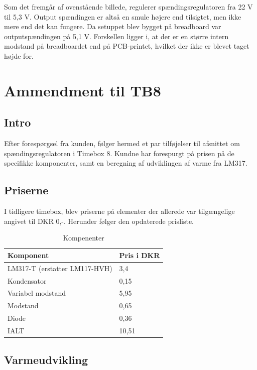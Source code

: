 Som det fremgår af ovenstående billede, regulerer spændingsregulatoren fra 22 V til 5,3 V. Output spændingen er altså en smule højere end tilsigtet, men ikke mere end det kan fungere. Da setuppet blev bygget på breadboard var outputspændingen på 5,1 V. Forskellen ligger i, at der er en større intern modstand på breadboardet end på PCB-printet, hvilket der ikke er blevet taget højde for. 
\clearpage
\section{Ammendment til TB8}
\label{sec:ammendment-til-tb8}

\subsection{Intro}
\label{sec:intro}

Efter forespørgsel fra kunden, følger hermed et par tilføjelser til afsnittet om spændingsregulatoren i Timebox 8. 
Kundne har forespurgt på prisen på de specifikke komponenter, samt en beregning af udviklingen af varme fra LM317. 

\subsection{Priserne}
\label{sec:priserne}

I tidligere timebox, blev priserne på elementer der allerede var tilgængelige angivet til DKR 0,-. Herunder følger den opdaterede prisliste.

\begin{table}[h]
  \centering
\begin{tabular}{ll}
\hline
Komponent & Pris i DKR \\
\hline
LM317-T (erstatter LM117-HVH) & 3,4 \\
\hline
Kondensator & 0,15 \\
\hline
Variabel modstand & 5,95 \\
\hline
Modstand & 0,65 \\
\hline
Diode & 0,36 \\
\hline
IALT & 10,51 \\
\hline
\end{tabular}
  \caption{Kompenenter}
  \label{tab:komp}
\end{table}

\subsection{Varmeudvikling}
\label{sec:varmeudvikling}

